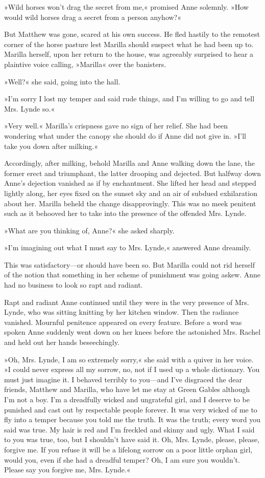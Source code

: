 »Wild horses won't drag the secret from me,« promised Anne solemnly. »How would wild horses drag a secret from a person anyhow?«

But Matthew was gone, scared at his own success. He fled hastily to the remotest corner of the horse pasture lest Marilla should suspect what he had been up to. Marilla herself, upon her return to the house, was agreeably surprised to hear a plaintive voice calling, »Marilla« over the banisters.

»Well?« she said, going into the hall.

»I'm sorry I lost my temper and said rude things, and I'm willing to go and tell Mrs. Lynde so.«

»Very well.« Marilla's crispness gave no sign of her relief. She had been wondering what under the canopy she should do if Anne did not give in. »I'll take you down after milking.«

Accordingly, after milking, behold Marilla and Anne walking down the lane, the former erect and triumphant, the latter drooping and dejected. But halfway down Anne's dejection vanished as if by enchantment. She lifted her head and stepped lightly along, her eyes fixed on the sunset sky and an air of subdued exhilaration about her. Marilla beheld the change disapprovingly. This was no meek penitent such as it behooved her to take into the presence of the offended Mrs. Lynde.

»What are you thinking of, Anne?« she asked sharply.

»I'm imagining out what I must say to Mrs. Lynde,« answered Anne dreamily.

This was satisfactory—or should have been so. But Marilla could not rid herself of the notion that something in her scheme of punishment was going askew. Anne had no business to look so rapt and radiant.

Rapt and radiant Anne continued until they were in the very presence of Mrs. Lynde, who was sitting knitting by her kitchen window. Then the radiance vanished. Mournful penitence appeared on every feature. Before a word was spoken Anne suddenly went down on her knees before the astonished Mrs. Rachel and held out her hands beseechingly.

»Oh, Mrs. Lynde, I am so extremely sorry,« she said with a quiver in her voice. »I could never express all my sorrow, no, not if I used up a whole dictionary. You must just imagine it. I behaved terribly to you—and I've disgraced the dear friends, Matthew and Marilla, who have let me stay at Green Gables although I'm not a boy. I'm a dreadfully wicked and ungrateful girl, and I deserve to be punished and cast out by respectable people forever. It was very wicked of me to fly into a temper because you told me the truth. It was the truth; every word you said was true. My hair is red and I'm freckled and skinny and ugly. What I said to you was true, too, but I shouldn't have said it. Oh, Mrs. Lynde, please, please, forgive me. If you refuse it will be a lifelong sorrow on a poor little orphan girl, would you, even if she had a dreadful temper? Oh, I am sure you wouldn't. Please say you forgive me, Mrs. Lynde.«

